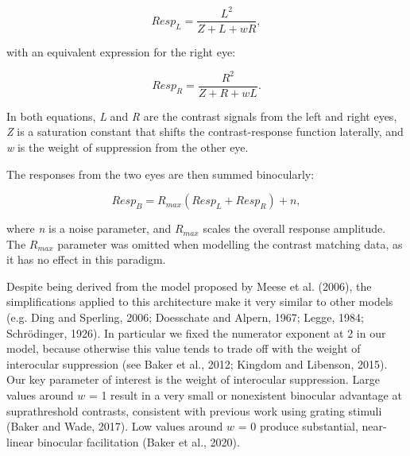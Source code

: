 \documentclass[
]{article}
\begin{document}
\begin{equation}
\label{eq:respL}
Resp_L = \frac{L^2}{Z + L + wR},
\end{equation}

with an equivalent expression for the right eye:

\begin{equation}
\label{eq:respR}
Resp_R = \frac{R^2}{Z + R + wL}.
\end{equation}

In both equations, \emph{L} and \emph{R} are the contrast signals from the left and right eyes, \emph{Z} is a saturation constant that shifts the contrast-response function laterally, and \emph{w} is the weight of suppression from the other eye.

The responses from the two eyes are then summed binocularly:

\begin{equation}
\label{eq:respB}
Resp_B = R_{max}(Resp_L + Resp_R) + n,
\end{equation}

where \emph{n} is a noise parameter, and \(R_{max}\) scales the overall response amplitude. The \(R_{max}\) parameter was omitted when modelling the contrast matching data, as it has no effect in this paradigm.

Despite being derived from the model proposed by Meese et al. (2006), the simplifications applied to this architecture make it very similar to other models (e.g. Ding and Sperling, 2006; Doesschate and Alpern, 1967; Legge, 1984; Schrödinger, 1926). In particular we fixed the numerator exponent at 2 in our model, because otherwise this value tends to trade off with the weight of interocular suppression (see Baker et al., 2012; Kingdom and Libenson, 2015). Our key parameter of interest is the weight of interocular suppression. Large values around \(w\) = 1 result in a very small or nonexistent binocular advantage at suprathreshold contrasts, consistent with previous work using grating stimuli (Baker and Wade, 2017). Low values around \(w\) = 0 produce substantial, near-linear binocular facilitation (Baker et al., 2020).
\end{document}
